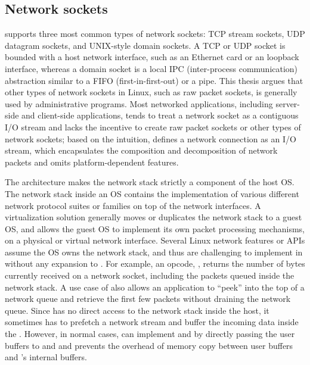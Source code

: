 \subsection{Network sockets}
\label{sec:libos:socket}

\thelibos{} supports three most common types of network sockets: TCP stream sockets, UDP datagram sockets, and UNIX-style domain sockets.
A TCP or UDP socket is bounded with a host network interface,
such as an Ethernet card or an loopback interface,
whereas a domain socket is a local IPC (inter-process communication) abstraction
similar to a FIFO (first-in-first-out) or a pipe.
This thesis argues that other types of network sockets
in Linux, such as raw packet sockets, is generally used by administrative programs.
Most networked applications, including server-side and client-side applications, tends to treat a network socket
as a contiguous I/O stream and lacks the incentive to create raw packet sockets or other types of network sockets; based on the intuition,
\thehostabi{} defines a network connection as an I/O stream, which encapsulates the composition and decomposition of network packets
and omits platform-dependent features.

The \graphene{} architecture makes the network stack strictly a component of the host OS.
The network stack inside an OS contains the implementation of various different network protocol suites or families on top of the network interfaces.
A virtualization solution generally moves or duplicates
the network stack to a guest OS,
and allows the guest OS to implement its own packet processing mechanisms,
on a physical or virtual network interface.
Several Linux network features or APIs assume
the OS owns the network stack, and thus are challenging to implement in \thelibos{}
without any expansion to \thehostabi{}.
For example,
an  opcode, ,
returns the number of bytes currently received on a network socket, including the packets queued inside the network stack. 
A use case of  also allows an application
to ``peek'' into the top of a network queue
and retrieve the first few packets without draining the network queue.
Since \thelibos{} has no direct access to the network stack
inside the host,
it sometimes has to prefetch a network stream
and buffer the incoming data inside the \picoproc{}.
However, in normal cases, \thelibos{} can implement  and  by directly passing the user buffers to  and  and prevents the overhead of memory copy between user buffers and \thelibos{}'s internal buffers. 




